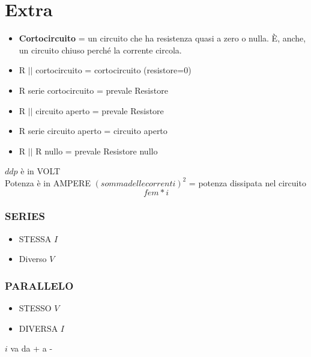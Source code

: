 \documentclass[17pt]{extarticle}
\begin{document}
\section{Extra}
\begin{itemize}
    \item \textbf{Cortocircuito} = un circuito che ha resistenza quasi a zero o nulla. È, anche, un circuito chiuso perché la corrente circola.
    \item R $||$ cortocircuito = cortocircuito (resistore=0)
    \item R serie cortocircuito = prevale Resistore
    \item R $||$ circuito aperto = prevale Resistore
    \item R serie circuito aperto = circuito aperto
    \item R $||$ R nullo = prevale Resistore nullo
\end{itemize}

$ddp$ è in VOLT\\
Potenza è in AMPERE $(somma delle correnti)^2$ = potenza dissipata nel circuito
\begin{equation*}
    fem*i
\end{equation*}

\subsubsection*{SERIES}
\begin{itemize}
    \item STESSA $I$
    \item Diverso $V$
\end{itemize}

\subsubsection*{PARALLELO}
\begin{itemize}
    \item STESSO $V$
    \item DIVERSA $I$
\end{itemize}

$i$ va da + a -
\end{document}
